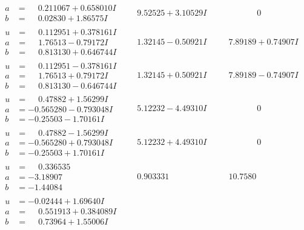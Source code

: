 \documentclass[1p]{elsarticle_modified}
\theoremstyle{definition}
\begin{document}
$$\begin{array}{c|c|c}
\begin{aligned}
a &= \phantom{-}0.211067 + 0.658010 I \\
b &= \phantom{-}0.02830 + 1.86575 I\end{aligned}
 & \phantom{-}9.52525 + 3.10529 I & \phantom{-0.000000 } 0 \\ \hline\begin{aligned}
u &= \phantom{-}0.112951 + 0.378161 I \\
a &= \phantom{-}1.76513 - 0.79172 I \\
b &= \phantom{-}0.813130 + 0.646744 I\end{aligned}
 & \phantom{-}1.32145 - 0.50921 I & \phantom{-}7.89189 + 0.74907 I \\ \hline\begin{aligned}
u &= \phantom{-}0.112951 - 0.378161 I \\
a &= \phantom{-}1.76513 + 0.79172 I \\
b &= \phantom{-}0.813130 - 0.646744 I\end{aligned}
 & \phantom{-}1.32145 + 0.50921 I & \phantom{-}7.89189 - 0.74907 I \\ \hline\begin{aligned}
u &= \phantom{-}0.47882 + 1.56299 I \\
a &= -0.565280 - 0.793048 I \\
b &= -0.25503 - 1.70161 I\end{aligned}
 & \phantom{-}5.12232 - 4.49310 I & \phantom{-0.000000 } 0 \\ \hline\begin{aligned}
u &= \phantom{-}0.47882 - 1.56299 I \\
a &= -0.565280 + 0.793048 I \\
b &= -0.25503 + 1.70161 I\end{aligned}
 & \phantom{-}5.12232 + 4.49310 I & \phantom{-0.000000 } 0 \\ \hline\begin{aligned}
u &= \phantom{-}0.336535\phantom{ +0.000000I} \\
a &= -3.18907\phantom{ +0.000000I} \\
b &= -1.44084\phantom{ +0.000000I}\end{aligned}
 & \phantom{-}0.903331\phantom{ +0.000000I} & \phantom{-}10.7580\phantom{ +0.000000I} \\ \hline\begin{aligned}
u &= -0.02444 + 1.69640 I \\
a &= \phantom{-}0.551913 + 0.384089 I \\
b &= \phantom{-}0.73964 + 1.55006 I\end{aligned}

\end{array}$$
\end{document}
